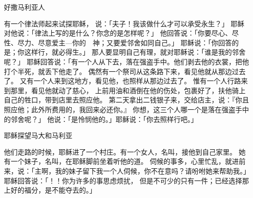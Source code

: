 {\par }{\SH 好撒马利亚人
\par }{\PP {}有一个律法师起来试探耶稣， 说：「夫子！我该做什么才可以承受永生？」
耶稣对他说：「律法上写的是什么？你念的是怎样呢？」
他回答说：「你要尽心、尽性、尽力、尽意爱主—你的　神；又要爱邻舍如同自己。」
耶稣说：「你回答的是；你这样行，就必得{}生。」
那人要显明自己有理，就对耶稣说：「谁是我的邻舍呢？」
耶稣回答说：「有一个人从{}下{}去，落在强盗手中。他们剥去他的衣裳，把他打个半死，就丢下他走了。
偶然有一个祭司从这条路下来，看见他就从那边过去了。
又有一个{}人来到这地方，看见他，也照样从那边过去了。
惟有一个{}人行路来到那里，看见他就动了慈心，
上前用油和酒倒在他的伤处，包裹好了，扶他骑上自己的牲口，带到店里去照应他。
第二天拿出二钱银子来，交给店主，说：『你且照应他；此外所费用的，我回来必还你。』
你想，这三个人哪一个是落在强盗手中的邻舍呢？」
他说：「是怜悯他的。」耶稣说：「你去照样行吧。」
\par }{\SH 耶稣探望马大和马利亚
\par }{\PP {}他们走路的时候，耶稣进了一个村庄。有一个女人，名叫{}，接他到自己家里。
她有一个妹子，名叫{}，在耶稣脚前坐着听他的道。
伺候的事多，心里忙乱，就进前来，说：「主啊，我的妹子留下我一个人伺候，你不在意吗？请吩咐她来帮助我。」
耶稣回答说：「{}！{}！你为许多的事思虑烦扰，
但是不可少的只有一件；{}已经选择那上好的福分，是不能夺去的。」

}
